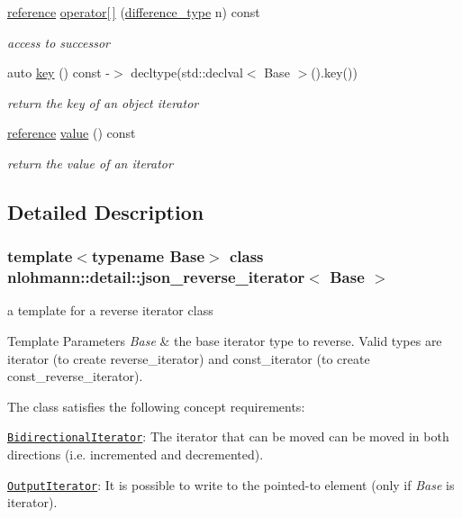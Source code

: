 \begin{DoxyCompactItemize}
\hyperlink{classnlohmann_1_1detail_1_1json__reverse__iterator_a42f51a69bac7b2aebb613b2164e457f1}{reference} \hyperlink{classnlohmann_1_1detail_1_1json__reverse__iterator_a8ed9e445e03c49c46612eb7f7d55bb61}{operator\mbox{[}$\,$\mbox{]}} (\hyperlink{classnlohmann_1_1detail_1_1json__reverse__iterator_a9ab55987c05ec6427ad36082e351cc45}{difference\+\_\+type} n) const
\begin{DoxyCompactList}\small\item\em access to successor \end{DoxyCompactList}\item 
auto \hyperlink{classnlohmann_1_1detail_1_1json__reverse__iterator_adc648a641e8e9a1072c5abd56ad06401}{key} () const -\/$>$ decltype(std\+::declval$<$ Base $>$().key())
\begin{DoxyCompactList}\small\item\em return the key of an object iterator \end{DoxyCompactList}\item 
\hyperlink{classnlohmann_1_1detail_1_1json__reverse__iterator_a42f51a69bac7b2aebb613b2164e457f1}{reference} \hyperlink{classnlohmann_1_1detail_1_1json__reverse__iterator_ae22803d442d483041d17239615f83b58}{value} () const
\begin{DoxyCompactList}\small\item\em return the value of an iterator \end{DoxyCompactList}\end{DoxyCompactItemize}


\subsection{Detailed Description}
\subsubsection*{template$<$typename Base$>$\newline
class nlohmann\+::detail\+::json\+\_\+reverse\+\_\+iterator$<$ Base $>$}

a template for a reverse iterator class 


\begin{DoxyTemplParams}{Template Parameters}
{\em Base} & the base iterator type to reverse. Valid types are iterator (to create reverse\+\_\+iterator) and const\+\_\+iterator (to create const\+\_\+reverse\+\_\+iterator).\\
\hline
\end{DoxyTemplParams}
The class satisfies the following concept requirements\+:
\begin{DoxyItemize}
\item \href{https://en.cppreference.com/w/cpp/named_req/BidirectionalIterator}{\tt Bidirectional\+Iterator}\+: The iterator that can be moved can be moved in both directions (i.\+e. incremented and decremented).
\item \href{https://en.cppreference.com/w/cpp/named_req/OutputIterator}{\tt Output\+Iterator}\+: It is possible to write to the pointed-\/to element (only if {\itshape Base} is iterator).
\end{DoxyItemize}

